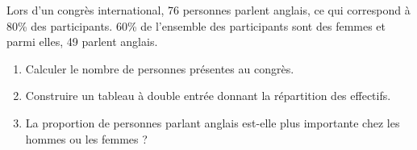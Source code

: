 
Lors d'un congrès international, 76  personnes parlent anglais, ce qui correspond à 80\% des participants. 60\% de l'ensemble des participants sont des femmes et parmi elles, 49  parlent anglais.

\begin{enumerate}
\item Calculer le nombre de personnes présentes au congrès.
\item Construire un tableau à double entrée donnant la répartition des effectifs.
\item La proportion de personnes parlant anglais est-elle plus importante chez les hommes ou les femmes ?
\end{enumerate} 